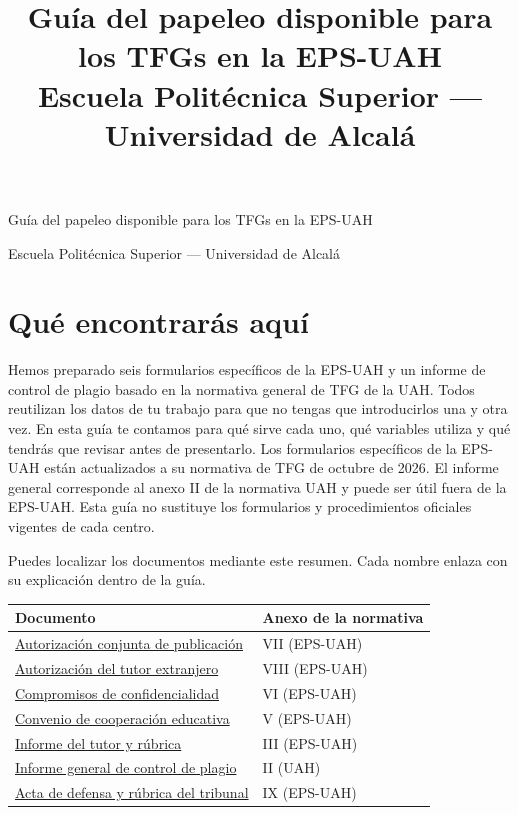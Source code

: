 \documentclass[10pt,a4paper]{article}
\title{Guía del papeleo disponible para los TFGs en la EPS-UAH\\\large Escuela Politécnica Superior --- Universidad de Alcalá}
\author{}
\date{}
\begin{document}
\begin{center}
{\LARGE Guía del papeleo disponible para los TFGs en la EPS-UAH\par}
\medskip
{\large Escuela Politécnica Superior --- Universidad de Alcalá\par}
\end{center}

{\small
\setlength{\parskip}{0pt}
\tableofcontents
}
\medskip

\section{Qué encontrarás aquí}

Hemos preparado seis formularios específicos de la EPS-UAH y un informe de control de plagio basado en la normativa general de TFG de la UAH. Todos reutilizan los datos de tu trabajo para que no tengas que introducirlos una y otra vez. En esta guía te contamos para qué sirve cada uno, qué variables utiliza y qué tendrás que revisar antes de presentarlo. Los formularios específicos de la EPS-UAH están actualizados a su normativa de TFG de octubre de 2026. El informe general corresponde al anexo II de la normativa UAH y puede ser útil fuera de la EPS-UAH. Esta guía no sustituye los formularios y procedimientos oficiales vigentes de cada centro.

Puedes localizar los documentos mediante este resumen. Cada nombre enlaza con su explicación dentro de la guía.

\medskip
\begin{tabularx}{\textwidth}{@{}Xl@{}}
\toprule
Documento & Anexo de la normativa \\
\midrule
\hyperref[form:conjunta]{Autorización conjunta de publicación} & VII (EPS-UAH) \\
\hyperref[form:extranjero]{Autorización del tutor extranjero} & VIII (EPS-UAH) \\
\hyperref[form:confidencialidad]{Compromisos de confidencialidad} & VI (EPS-UAH) \\
\hyperref[form:convenio]{Convenio de cooperación educativa} & V (EPS-UAH) \\
\hyperref[form:informe]{Informe del tutor y rúbrica} & III (EPS-UAH) \\
\hyperref[form:plagio]{Informe general de control de plagio} & II (UAH) \\
\hyperref[form:acta]{Acta de defensa y rúbrica del tribunal} & IX (EPS-UAH) \\
\bottomrule
\end{tabularx}
\end{document}
